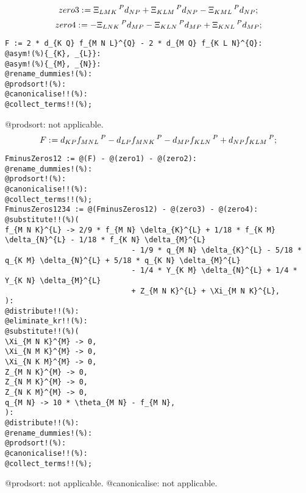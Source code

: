 \documentclass[11pt]{article}
\def\specialcolon{\mathrel{\mathop{:}}\hspace{-.5em}}
\begin{document}
\begin{dmath*}[compact, spread=2pt]
zero3\specialcolon{}= {\Xi}_{L M K}\,^{P} {d}_{N P} + {\Xi}_{K L M}\,^{P} {d}_{N P} - {\Xi}_{K M L}\,^{P} {d}_{N P};
\end{dmath*}
\begin{dmath*}[compact, spread=2pt]
zero4\specialcolon{}=  - {\Xi}_{L N K}\,^{P} {d}_{M P} - {\Xi}_{K L N}\,^{P} {d}_{M P} + {\Xi}_{K N L}\,^{P} {d}_{M P};
\end{dmath*}
{\color[named]{Blue}\begin{verbatim}
F := 2 * d_{K Q} f_{M N L}^{Q} - 2 * d_{M Q} f_{K L N}^{Q}:
@asym!(%){_{K}, _{L}}:
@asym!(%){_{M}, _{N}}:
@rename_dummies!(%):
@prodsort!(%):
@canonicalise!!(%):
@collect_terms!!(%);
\end{verbatim}}
@prodsort: not applicable.
\begin{dmath*}[compact, spread=2pt]
F\specialcolon{}= {d}_{K P} {f}_{M N L}\,^{P} - {d}_{L P} {f}_{M N K}\,^{P} - {d}_{M P} {f}_{K L N}\,^{P} + {d}_{N P} {f}_{K L M}\,^{P};
\end{dmath*}
{\color[named]{Blue}\begin{verbatim}
FminusZeros12 := @(F) - @(zero1) - @(zero2):
@rename_dummies!(%):
@prodsort!(%):
@canonicalise!!(%):
@collect_terms!!(%);
FminusZeros1234 := @(FminusZeros12) - @(zero3) - @(zero4):
@substitute!!(%)(
f_{M N K}^{L} -> 2/9 * f_{M N} \delta_{K}^{L} + 1/18 * f_{K M} \delta_{N}^{L} - 1/18 * f_{K N} \delta_{M}^{L}
                             - 1/9 * q_{M N} \delta_{K}^{L} - 5/18 * q_{K M} \delta_{N}^{L} + 5/18 * q_{K N} \delta_{M}^{L}
                             - 1/4 * Y_{K M} \delta_{N}^{L} + 1/4 * Y_{K N} \delta_{M}^{L}
                             + Z_{M N K}^{L} + \Xi_{M N K}^{L},
):
@distribute!!(%):
@eliminate_kr!!(%):
@substitute!!(%)(
\Xi_{M N K}^{M} -> 0,
\Xi_{N M K}^{M} -> 0,
\Xi_{N K M}^{M} -> 0,
Z_{M N K}^{M} -> 0,
Z_{N M K}^{M} -> 0,
Z_{N K M}^{M} -> 0,
q_{M N} -> 10 * \theta_{M N} - f_{M N},
):
@distribute!!(%):
@rename_dummies!(%):
@prodsort!(%):
@canonicalise!!(%):
@collect_terms!!(%);
\end{verbatim}}
@prodsort: not applicable.
@canonicalise: not applicable.
\end{document}

